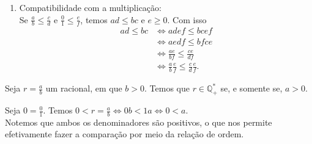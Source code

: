 \documentclass[../main.tex]{subfiles}
\begin{document}
\begin{dem}
\begin{enumerate}[label=(\roman*)]
        \item Compatibilidade com a multiplicação: \\
        Se $\frac{a}{b} \leq \frac{c}{d}$ e $\frac{0}{1} \leq \frac{e}{f}$, temos $ad \leq bc$ e $e \geq 0$. Com isso 
        \begin{align*}
            ad \leq bc 
            &\iff adef \leq bcef \\
            &\iff  aedf \leq bfce \\
            &\iff \frac{ae}{bf} \leq \frac{ce}{df} \\
            &\iff \frac{a}{b} \frac{e}{f} \leq \frac{c}{d} \frac{e}{f}.   
        \end{align*}        
    \end{enumerate}
\end{dem}

\begin{prop}\label{rac-prop-numeradorPositivo}
    Seja $r = \frac{a}{b}$ um racional, em que $b > 0$. Temos que $r \in \mathbb{Q}_{+}^*$ se, e somente se, $a > 0$.
\end{prop}
\begin{dem}
    Seja $0 = \frac{0}{1}$. Temos $0 < r = \frac{a}{b} \iff 0b < 1a \iff 0 < a$. \\
    Notemos que ambos os denominadores são positivos, o que nos permite efetivamente fazer a comparação por meio da relação de ordem.
\end{dem}
\end{document}
